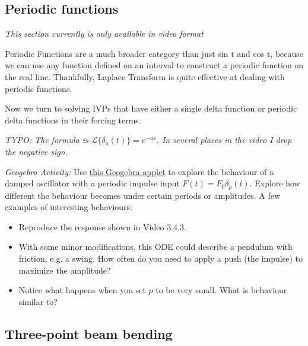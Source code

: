 \subsection{Periodic functions}

\emph{This section currently is only available in video format}
\begin{video}
	Periodic Functions are a much broader category than just sin t and cos t, because we can use any function defined on an interval to construct a periodic function on the real line. Thankfully, Laplace Transform is quite effective at dealing with periodic functions. 
\end{video}

\begin{video}
	Now we turn to solving IVPs that have either a single delta function or periodic delta functions in their forcing terms. 

	\emph{TYPO: The formula is $\mathcal{L}\{\delta_a(t)\}=e^{-as}$. In several places in the video I drop the negative sign.}
\end{video}

\begin{example}
	\emph{Geogebra Activity:} Use \href{https://www.geogebra.org/m/wzhdm4be}{this Geogebra applet} to explore the behaviour of a damped oscillator with a periodic impulse input $F(t)=F_0\delta_p(t)$. Explore how different the behaviour becomes under certain periods or amplitudes. A few examples of interesting behaviours:
	\begin{itemize}
	\item Reproduce the response shown in Video 3.4.3.
	\item  With some minor modifications, this ODE could describe a pendulum with friction, e.g. a swing. How often do you need to apply a push (the impulse) to maximize the amplitude? 
	\item Notice what happens when you set $p$ to be very small. What is behaviour similar to?  
	\end{itemize}
	
  
  
  
	\end{example}



\subsection{Three-point beam bending}

